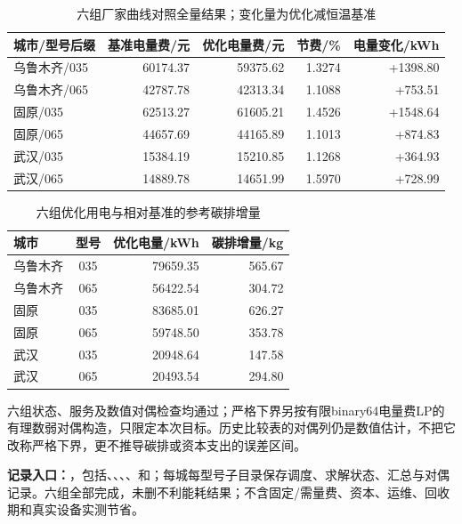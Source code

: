 \begin{table}[H]
\centering
\caption{六组厂家曲线对照全量结果；变化量为优化减恒温基准}
\begin{tabularx}{\linewidth}{@{}Yrrrr@{}}
\toprule
城市/型号后缀 & 基准电量费/元 & 优化电量费/元 & 节费/\% & 电量变化/kWh\\\midrule
乌鲁木齐/035 & 60174.37 & 59375.62 & 1.3274 & +1398.80\\
乌鲁木齐/065 & 42787.78 & 42313.34 & 1.1088 & +753.51\\
固原/035 & 62513.27 & 61605.21 & 1.4526 & +1548.64\\
固原/065 & 44657.69 & 44165.89 & 1.1013 & +874.83\\
武汉/035 & 15384.19 & 15210.85 & 1.1268 & +364.93\\
武汉/065 & 14889.78 & 14651.99 & 1.5970 & +728.99\\
\bottomrule
\end{tabularx}
\end{table}

\begin{table}[H]
\centering
\caption{六组优化用电与相对基准的参考碳排增量}
\begin{tabularx}{\linewidth}{@{}Ycrr@{}}
\toprule
城市 & 型号 & 优化电量/kWh & 碳排增量/kg\\\midrule
乌鲁木齐 & 035 & 79659.35 & 565.67\\
乌鲁木齐 & 065 & 56422.54 & 304.72\\
固原 & 035 & 83685.01 & 626.27\\
固原 & 065 & 59748.50 & 353.78\\
武汉 & 035 & 20948.64 & 147.58\\
武汉 & 065 & 20493.54 & 294.80\\
\bottomrule
\end{tabularx}
\end{table}

六组状态、服务及数值对偶检查均通过；严格下界另按有限binary64电量费LP的有理数弱对偶构造，只限定本次目标。历史比较表的对偶列仍是数值估计，不把它改称严格下界，更不推导碳排或资本支出的误差区间。

\noindent\textbf{记录入口：}，包括、、、、和；每城每型号子目录保存调度、求解状态、汇总与对偶记录。六组全部完成，未删不利能耗结果；不含固定/需量费、资本、运维、回收期和真实设备实测节省。

